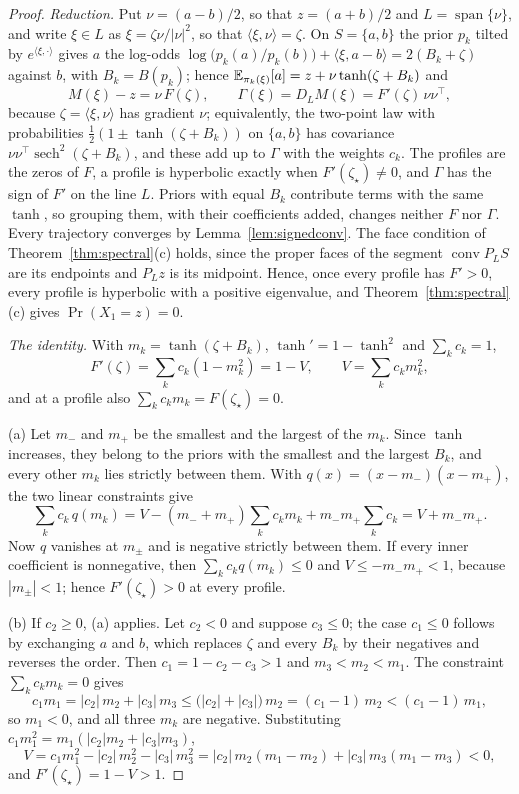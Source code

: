 \documentclass{article} %
\theoremstyle{plain}
\theoremstyle{definition}
\theoremstyle{remark}
\begin{document}
\proptwoatom*
\begin{proof}
\emph{Reduction.} Put $\nu=(a-b)/2$, so that $z=(a+b)/2$ and $L=\operatorname{span}\{\nu\}$, and
write $\xi\in L$ as $\xi=\zeta\nu/|\nu|^2$, so that $\langle\xi,\nu\rangle=\zeta$. On $S=\{a,b\}$
the prior $p_k$ tilted by $e^{\langle\xi,\cdot\rangle}$ gives $a$ the log-odds
$\log\bigl(p_k(a)/p_k(b)\bigr)+\langle\xi,a-b\rangle=2(B_k+\zeta)$ against $b$, with
$B_k=B(p_k)$; hence $\mathbb{E}_{\pi_k(\xi)}[a]=z+\nu\tanh(\zeta+B_k)$ and
\[
M(\xi)-z=\nu\,F(\zeta),\qquad
\Gamma(\xi)=D_LM(\xi)=F'(\zeta)\,\nu\nu^\top,
\]
because $\zeta=\langle\xi,\nu\rangle$ has gradient $\nu$; equivalently, the two-point law with
probabilities $\tfrac12(1\pm\tanh(\zeta+B_k))$ on $\{a,b\}$ has covariance
$\nu\nu^\top\operatorname{sech}^2(\zeta+B_k)$, and these add up to $\Gamma$ with the weights $c_k$. The profiles are the zeros of
$F$, a profile is hyperbolic exactly when $F'(\zeta_\star)\neq0$, and $\Gamma$ has the sign of
$F'$ on the line $L$. Priors with equal $B_k$ contribute terms with the same $\tanh$, so grouping
them, with their coefficients added, changes neither $F$ nor $\Gamma$. Every trajectory converges
by Lemma~\ref{lem:signedconv}. The face condition of Theorem~\ref{thm:spectral}(c) holds, since the
proper faces of the segment $\operatorname{conv}P_LS$ are its endpoints and $P_Lz$ is its
midpoint. Hence, once every profile has $F'>0$, every profile is hyperbolic with a positive
eigenvalue, and Theorem~\ref{thm:spectral}(c) gives $\Pr(X_1=z)=0$.

\emph{The identity.} With $m_k=\tanh(\zeta+B_k)$, $\tanh'=1-\tanh^2$ and $\sum_kc_k=1$,
\[
F'(\zeta)=\sum_kc_k(1-m_k^2)=1-V,\qquad V=\sum_kc_km_k^2 ,
\]
and at a profile also $\sum_kc_km_k=F(\zeta_\star)=0$.

(a) Let $m_-$ and $m_+$ be the smallest and the largest of the $m_k$. Since $\tanh$ increases,
they belong to the priors with the smallest and the largest $B_k$, and every other $m_k$ lies
strictly between them. With $q(x)=(x-m_-)(x-m_+)$, the two linear constraints give
\[
\sum_kc_k\,q(m_k)=V-(m_-+m_+)\sum_kc_km_k+m_-m_+\sum_kc_k=V+m_-m_+ .
\]
Now $q$ vanishes at $m_\pm$ and is negative strictly between them. If every inner coefficient is
nonnegative, then $\sum_kc_kq(m_k)\le0$ and $V\le-m_-m_+<1$, because $|m_\pm|<1$; hence
$F'(\zeta_\star)>0$ at every profile.

(b) If $c_2\ge0$, (a) applies. Let $c_2<0$ and suppose $c_3\le0$; the case $c_1\le0$ follows by
exchanging $a$ and $b$, which replaces $\zeta$ and every $B_k$ by their negatives and reverses the
order. Then $c_1=1-c_2-c_3>1$ and $m_3<m_2<m_1$. The constraint $\sum_kc_km_k=0$ gives
\[
c_1m_1=|c_2|\,m_2+|c_3|\,m_3\le\bigl(|c_2|+|c_3|\bigr)\,m_2=(c_1-1)\,m_2<(c_1-1)\,m_1 ,
\]
so $m_1<0$, and all three $m_k$ are negative. Substituting $c_1m_1^2=m_1(|c_2|m_2+|c_3|m_3)$,
\[
V=c_1m_1^2-|c_2|\,m_2^2-|c_3|\,m_3^2=|c_2|\,m_2(m_1-m_2)+|c_3|\,m_3(m_1-m_3)<0 ,
\]
and $F'(\zeta_\star)=1-V>1$.


\end{proof}
\end{document}
